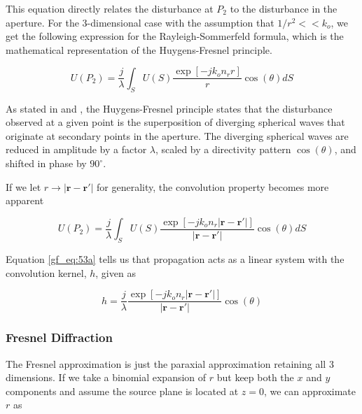 This equation directly relates the disturbance at $P_2$ to the disturbance in the aperture. For the 3-dimensional case with the assumption that $1/r^2 << k_o$, we get the following expression for the Rayleigh-Sommerfeld formula, which is the mathematical representation of the Huygens-Fresnel principle.

\begin{equation}
\boxed{U(P_2) =\frac{j}{\lambda}\int_S U(S)\frac{\exp\left[-jk_on_r r\right]}{r}\cos(\theta)dS}
\label{gf_eq:53}
\end{equation}
\renewcommand{\baselinestretch}{2} \small\normalsize

As stated in \cite{goodman_fourier} and \cite{gaskill_fourier}, the Huygens-Fresnel principle states that the disturbance observed at a given point is the superposition of diverging spherical waves that originate at secondary points in the aperture. The diverging spherical waves are reduced in amplitude by a factor $\lambda$, scaled by a directivity pattern $\cos(\theta)$, and shifted in phase by $90^{\circ}$.

\noindent If we let $r \rightarrow |\mathbf{r}-\mathbf{r}'|$ for generality, the convolution property becomes more apparent

\begin{equation}
U(P_2) =\frac{j}{\lambda}\int_S U(S)\frac{\exp\left[-jk_on_r |\mathbf{r}-\mathbf{r}'|\right]}{|\mathbf{r}-\mathbf{r}'|}\cos(\theta)dS
\label{gf_eq:53a}
\end{equation}
\renewcommand{\baselinestretch}{2} \small\normalsize

Equation \ref{gf_eq:53a} tells us that propagation acts as a linear system with the convolution kernel, $h$, given as

\begin{equation}
h=\frac{j}{\lambda}\frac{\exp\left[-jk_on_r |\mathbf{r}-\mathbf{r}'|\right]}{|\mathbf{r}-\mathbf{r}'|}\cos(\theta)
\label{gf_eq:53b}
\end{equation}
\renewcommand{\baselinestretch}{2} \small\normalsize

\subsubsection{Fresnel Diffraction}
The Fresnel approximation is just the paraxial approximation retaining all 3 dimensions. If we take a binomial expansion of $r$ but keep both the $x$ and $y$ components and assume the source plane is located at $z=0$, we can approximate $r$ as

